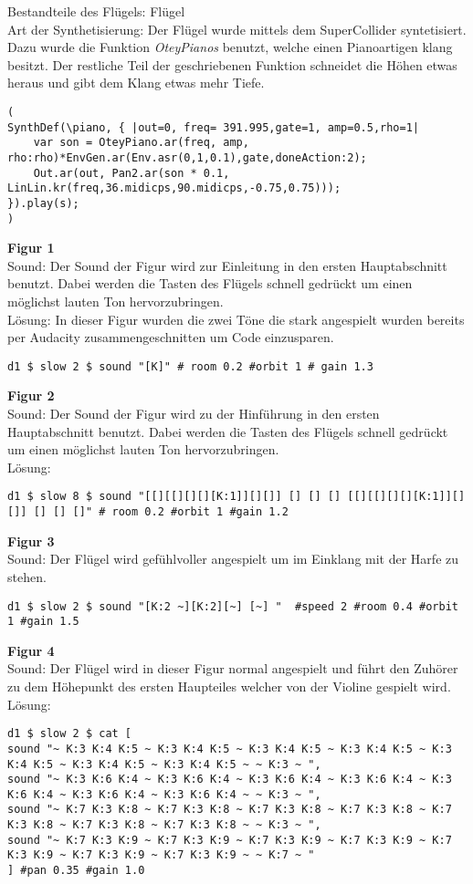 \documentclass[
10pt, %
a4paper, %
oneside, %
headinclude,footinclude, %
BCOR5mm, %
]{scrartcl}
\begin{document}
\noindent Bestandteile des Flügels: Flügel\\
Art der Synthetisierung: Der Flügel wurde mittels dem SuperCollider syntetisiert. Dazu wurde die Funktion \textit{OteyPianos} benutzt, welche einen Pianoartigen klang besitzt. Der restliche Teil der geschriebenen Funktion schneidet die Höhen etwas heraus und gibt dem Klang etwas mehr Tiefe. 
\begin{lstlisting}
(
SynthDef(\piano, { |out=0, freq= 391.995,gate=1, amp=0.5,rho=1|
    var son = OteyPiano.ar(freq, amp, rho:rho)*EnvGen.ar(Env.asr(0,1,0.1),gate,doneAction:2);
    Out.ar(out, Pan2.ar(son * 0.1, LinLin.kr(freq,36.midicps,90.midicps,-0.75,0.75)));
}).play(s);
)
\end{lstlisting}
\noindent \textbf{Figur 1}\\
Sound: Der Sound der Figur wird zur Einleitung in den ersten Hauptabschnitt benutzt. Dabei werden die Tasten des Flügels 
schnell gedrückt um einen möglichst lauten Ton hervorzubringen.\\
Lösung: In dieser Figur wurden die zwei Töne die stark angespielt wurden bereits per Audacity zusammengeschnitten um Code einzusparen.
\begin{lstlisting}
d1 $ slow 2 $ sound "[K]" # room 0.2 #orbit 1 # gain 1.3
\end{lstlisting}
\noindent \textbf{Figur 2}\\
Sound: Der Sound der Figur wird zu der Hinführung in den ersten Hauptabschnitt benutzt. Dabei werden die Tasten des Flügels 
schnell gedrückt um einen möglichst lauten Ton hervorzubringen.\\
Lösung:
\begin{lstlisting}
d1 $ slow 8 $ sound "[[][[][][][K:1]][][]] [] [] [] [[][[][][][K:1]][][]] [] [] []" # room 0.2 #orbit 1 #gain 1.2
\end{lstlisting}
\noindent \textbf{Figur 3}\\
Sound: Der Flügel wird gefühlvoller angespielt um im Einklang mit der Harfe zu stehen.
\begin{lstlisting}
d1 $ slow 2 $ sound "[K:2 ~][K:2][~] [~] "  #speed 2 #room 0.4 #orbit 1 #gain 1.5
\end{lstlisting}
\noindent \textbf{Figur 4}\\
Sound: Der Flügel wird in dieser Figur normal angespielt und führt den Zuhörer zu dem Höhepunkt des ersten Haupteiles welcher von der Violine gespielt wird.\\
Lösung:
\begin{lstlisting}
d1 $ slow 2 $ cat [
sound "~ K:3 K:4 K:5 ~ K:3 K:4 K:5 ~ K:3 K:4 K:5 ~ K:3 K:4 K:5 ~ K:3 K:4 K:5 ~ K:3 K:4 K:5 ~ K:3 K:4 K:5 ~ ~ K:3 ~ ",
sound "~ K:3 K:6 K:4 ~ K:3 K:6 K:4 ~ K:3 K:6 K:4 ~ K:3 K:6 K:4 ~ K:3 K:6 K:4 ~ K:3 K:6 K:4 ~ K:3 K:6 K:4 ~ ~ K:3 ~ ",
sound "~ K:7 K:3 K:8 ~ K:7 K:3 K:8 ~ K:7 K:3 K:8 ~ K:7 K:3 K:8 ~ K:7 K:3 K:8 ~ K:7 K:3 K:8 ~ K:7 K:3 K:8 ~ ~ K:3 ~ ",
sound "~ K:7 K:3 K:9 ~ K:7 K:3 K:9 ~ K:7 K:3 K:9 ~ K:7 K:3 K:9 ~ K:7 K:3 K:9 ~ K:7 K:3 K:9 ~ K:7 K:3 K:9 ~ ~ K:7 ~ "
] #pan 0.35 #gain 1.0
\end{lstlisting}
\end{document}
